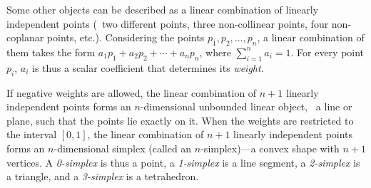 Some other objects can be described as a linear combination of linearly independent points (\ie\ two different points, three non-collinear points, four non-coplanar points, etc.).
Considering the points $p_1,p_2,\ldots,p_n$, a linear combination of them takes the form $a_1 p_1 + a_2 p_2 + \cdots + a_n p_n$, where $\sum_{i=1}^n a_i = 1$.
For every point $p_i$, $a_i$ is thus a scalar coefficient that determines its \emph{weight}.

If negative weights are allowed, the linear combination of $n+1$ linearly independent points forms an $n$-dimensional unbounded linear object, \eg\ a line or plane, such that the points lie exactly on it.
When the weights are restricted to the interval $[0,1]$, the linear combination of $n+1$ linearly independent points forms an $n$-dimensional simplex (called an $n$-simplex)---a convex shape with $n+1$ vertices.
A \emph{0-simplex} is thus a point, a \emph{1-simplex} is a line segment, a \emph{2-simplex} is a triangle, and a \emph{3-simplex} is a tetrahedron.

